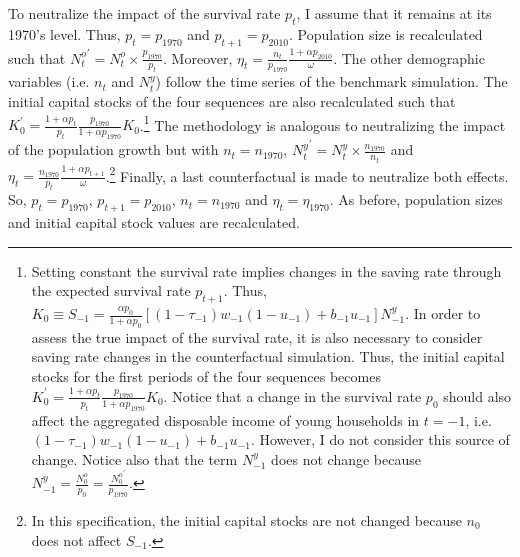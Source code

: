 To neutralize the impact of the survival rate $p_t$, I assume that it remains at its 1970's level. Thus, $p_t = p_{1970}$ and $p_{t+1} = p_{2010}$. Population size is recalculated such that ${N^o_t}^\prime = N_t^o\times\frac{p_{1970}}{p_t}$. Moreover, $\eta_t = \frac{n_t}{p_{1970}}\frac{1+\alpha p_{2010}}{\omega}$.
The other demographic variables (i.e. $n_t$ and $N^y_t$) follow the time series of the benchmark simulation. The initial capital stocks of the four sequences are also recalculated such that $K_0^\prime = \frac{1+\alpha p_t}{p_t}\frac{p_{1970}}{1+\alpha p_{1970}} K_0$.\footnote{Setting constant the survival rate implies changes in the saving rate through the expected survival rate $p_{t+1}$. Thus, $K_0 \equiv S_{-1} = \frac{\alpha p_0}{1+\alpha p_0}\left[(1-\tau_{-1})w_{-1}(1-u_{-1})+b_{-1}u_{-1}\right]N_{-1}^y$. In order to assess the true impact of the survival rate, it is also necessary to consider saving rate changes in the counterfactual simulation. Thus, the initial capital stocks for the first periods of the four sequences becomes $K_0^\prime = \frac{1+\alpha p_t}{p_t}\frac{p_{1970}}{1+\alpha p_{1970}} K_0$. Notice that a change in the survival rate $p_0$ should also affect the aggregated disposable income of young households in $t=-1$, i.e. $(1-\tau_{-1})w_{-1}(1-u_{-1})+b_{-1}u_{-1}$. However, I do not consider this source of change. Notice also that the term $N_{-1}^y$ does not change because $N_{-1}^y = \frac{N_0^o}{p_0} = \frac{{N_0^o}^\prime}{p_{1970}}$.} The methodology is analogous to neutralizing the impact of the population growth but with $n_t = n_{1970}$, ${N_t^y}^\prime = N_t^y\times\frac{n_{1970}}{n_t}$ and $\eta_t = \frac{n_{1970}}{p_t}\frac{1+\alpha p_{t+1}}{\omega}$.\footnote{In this specification, the initial capital stocks are not changed because $n_0$ does not affect $S_{-1}$.} Finally, a last counterfactual is made to neutralize both effects. So, $p_t = p_{1970}$, $p_{t+1} = p_{2010}$, $n_t = n_{1970}$ and $\eta_t = \eta_{1970}$. As before, population sizes and initial capital stock values are recalculated.
